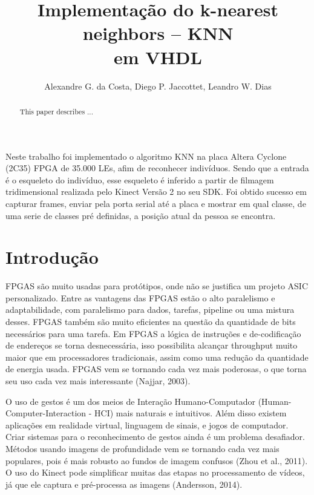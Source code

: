 \documentclass[12pt]{article}
\title{Implementa\c{c}\~ao do k-nearest neighbors -- KNN\\ em VHDL}
\author{Alexandre G. da Costa\inst{1}, Diego P. Jaccottet\inst{1}, Leandro W.
  Dias\inst{1} }
\begin{document}
 

\maketitle

\begin{abstract}
  This paper describes ...
\end{abstract}
     
\begin{resumo}
Neste trabalho foi implementado o algoritmo KNN na placa Altera Cyclone (2C35) FPGA de 35.000 LEs, afim de reconhecer
indivíduos. Sendo que a entrada é o esqueleto do indivíduo, esse esqueleto é inferido a partir de filmagem tridimensional
realizada pelo Kinect Versão 2 no seu SDK. Foi obtido sucesso em capturar frames, enviar pela porta serial até a placa e
mostrar em qual classe, de uma serie de classes pré definidas, a posição atual da pessoa se encontra.
\end{resumo}

\section{Introdu\c{c}\~ao}

FPGAS são muito usadas para protótipos, onde não se justifica um projeto ASIC personalizado. Entre as vantagens das FPGAS
estão o alto paralelismo e adaptabilidade, com paralelismo para dados, tarefas, pipeline ou uma mistura desses. FPGAS
também são muito eficientes na questão da quantidade de bits necessários para uma tarefa. Em FPGAS a lógica de instruções
e de-codificação de endereços se torna desnecessária, isso possibilita alcançar throughput muito maior que em
processadores tradicionais, assim como uma redução da quantidade de energia usada. FPGAS vem se tornando cada vez mais
poderosas, o que torna seu uso cada vez mais interessante (Najjar, 2003).

O uso de gestos é um dos meios de Interação Humano-Computador (Human-Computer-Interaction - HCI) mais naturais e 
intuitivos. Além disso existem aplicações em realidade virtual, linguagem de sinais, e jogos de computador. Criar
sistemas para o reconhecimento de gestos ainda é um problema desafiador. Métodos usando imagens de profundidade vem se 
tornando cada vez mais populares, pois é mais robusto ao fundos de imagem confusos (Zhou et al., 2011). O uso do Kinect
pode simplificar muitas das etapas no processamento de vídeos, já que ele captura e pré-processa as imagens (Andersson,
2014).
\end{document}
